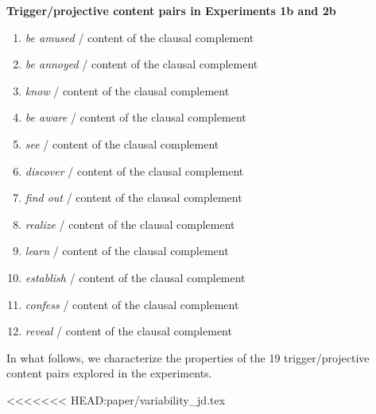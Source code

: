 \documentclass[11pt,fleqn]{article}
\newcommand{\6}{\mbox{$[\hspace*{-.6mm}[$}}
\newcommand{\9}{\mbox{$]\hspace*{-.6mm}]$}}
\begin{document}
\begin{exe}
\begin{enumerate}[itemsep=-.5mm]
\end{enumerate}


\ex\label{pairs1b2b} {\bf Trigger/projective content pairs in Experiments 1b and 2b}

\begin{enumerate}[itemsep=-.5mm]

\item {\em be amused} / content of the clausal complement

\item {\em be annoyed} / content of the clausal complement

\item {\em know} / content of the clausal complement

\item {\em be aware} / content of the clausal complement

\item {\em see} / content of the clausal complement

\item {\em discover} / content of the clausal complement

\item {\em find out} / content of the clausal complement

\item {\em realize} / content of the clausal complement

\item {\em learn} / content of the clausal complement

\item {\em establish} / content of the clausal complement

\item {\em confess} / content of the clausal complement

\item {\em reveal} / content of the clausal complement

\end{enumerate}

\end{exe}

In what follows, we characterize the properties of the 19 trigger/projective content pairs explored in the experiments.

<<<<<<< HEAD:paper/variability_jd.tex
\end{document}

